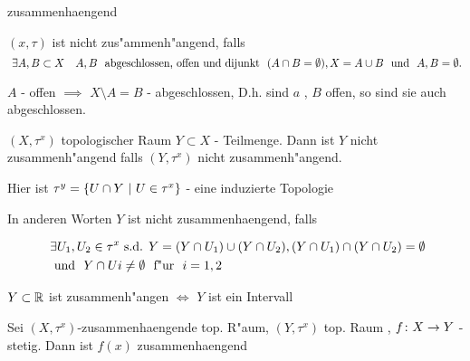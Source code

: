 \documentclass[class=article, crop=false]{standalone}
\begin{document}
\begin{zettel}{zusammenhaengend}
\begin{flashcard}
    \begin{definition}
        $(x,\tau)$ ist nicht zus"ammenh"angend, falls
\[
\exists  A,B \subset X \quad A,B  \tx{ abgeschlossen, offen und dijunkt } (A \cap B =  \emptyset), X =  A \cup B \tx{ und } A,B = \emptyset
.\]
\begin{remark}
$A$ - offen $\implies $ $X \setminus A =  B$ - abgeschlossen, D.h. sind $a$ , $B$ offen, so sind sie auch abgeschlossen.
\end{remark}
    \end{definition}
\end{flashcard}
\begin{definition}
    $(X,\tau^x)$ topologischer Raum $Y \subset X$ - Teilmenge. Dann ist $Y$ nicht zusammenh"angend falls $ (Y,\tau^x)$ nicht zusammenh"angend.

    Hier ist $\tau^y =  \set{U \cap Y}{U \in  \tau^x}$ - eine induzierte Topologie

    In anderen Worten $Y$ ist nicht zusammenhaengend, falls

    \begin{align*}
    &\exists U_1 , U_2 \in  \tau^x \text{ s.d. } Y = ( Y \cap U_1 ) \cup ( Y \cap U_2), ( Y \cap U_1 ) \cap ( Y \cap U_2) = \emptyset \\
    &\tx{ und } Y \cap Ui \neq  \emptyset \tx{ f"ur } i = 1,2
    \end{align*}
\end{definition}
\end{zettel}

\begin{lemma}
$Y \subset \mathbb{R} $ ist zusammenh"angen $\iff $ $Y$ ist ein Intervall
\end{lemma}

\begin{theorem}
Sei $(X,\tau^x)$-zusammenhaengende top. R"aum, $ (Y,\tau^x)$ top. Raum , $f \colon X\to Y $ - stetig. Dann ist $f(x)$ zusammenhaengend
\end{theorem}
\end{document}

